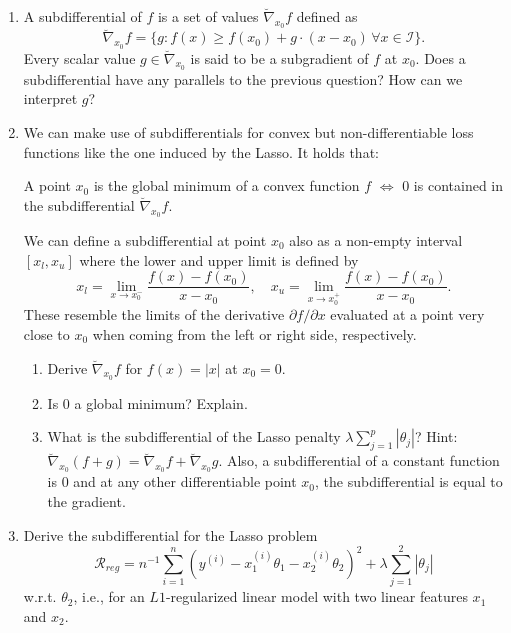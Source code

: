 \documentclass[a4paper]{article}
\begin{document}
{\begin{enumerate}
  \item A subdifferential of $f$ is a set of values $\breve{\nabla}_{x_0} f$ defined as $$\breve{\nabla}_{x_0} f = \{ g: f(x) \geq f(x_0) + g \cdot (x-x_0) \, \forall x \in \mathcal{I} \}.$$ Every scalar value $g \in \breve{\nabla}_{x_0}$ is said to be a subgradient of $f$ at $x_0$.  Does a subdifferential have any parallels to the previous question? How can we interpret $g$?
  \item We can make use of subdifferentials for convex but non-differentiable loss functions like the one induced by the Lasso. It holds that:\\
  \begin{center}
  A point $x_0$ is the global minimum of a convex function $f$ $\Leftrightarrow$ $0$ is contained in the subdifferential $\breve{\nabla}_{x_0} f$.\\
  \end{center}
  We can define a subdifferential at point $x_0$ also as a non-empty interval $[x_l,x_u]$ where the lower and upper limit is defined by $$x_l = \lim_{x \to x_0^{-}} \frac{f(x)-f(x_0)}{x-x_0}, \quad x_u = \lim_{x \to x_0^{+}} \frac{f(x)-f(x_0)}{x-x_0}.$$ These resemble the limits of the derivative $\partial f / \partial x$ evaluated at a point very close to $x_0$ when coming from the left or right side, respectively. 
  \begin{enumerate}
  \item Derive $\breve{\nabla}_{x_0} f$ for $f(x) = |x|$ at $x_0 = 0$.
  \item Is $0$ a global minimum? Explain.
  \item What is the subdifferential of the Lasso penalty $\lambda \sum_{j=1}^p |\theta_j|$? Hint: $\breve{\nabla}_{x_0} (f+g) = \breve{\nabla}_{x_0} f + \breve{\nabla}_{x_0} g$. Also, a subdifferential of a constant function is $0$ and at any other differentiable point $x_0$, the subdifferential is equal to the gradient.
  \end{enumerate}
  \item Derive the subdifferential for the Lasso problem  $$\mathcal{R}_{reg} = n^{-1} \sum_{i=1}^n (y^{(i)} - x^{(i)}_{1}\theta_1 - x^{(i)}_{2}\theta_2)^2 + \lambda \sum_{j=1}^2 |\theta_j|$$ w.r.t. $\theta_2$, i.e., for an $L1$-regularized linear model with two linear features $x_1$ and $x_2$.
\end{enumerate}



}
\end{document}
